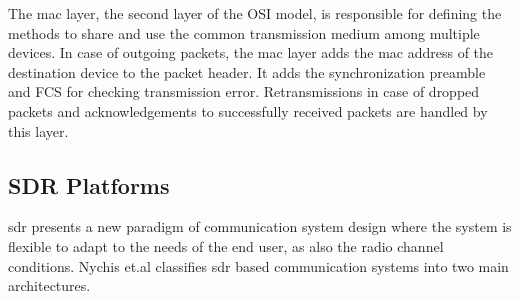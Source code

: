The \ac{mac} layer, the second layer of the \ac{OSI} model, is responsible for defining the methods to share and use the common transmission medium among multiple devices.
In case of outgoing packets, the \ac{mac} layer adds the \ac{mac} address of the destination device to the packet header.
It adds the synchronization preamble and \ac{FCS} for checking transmission error.
Retransmissions in case of dropped packets and acknowledgements to successfully received packets are handled by this layer.\\
 

\subsection{SDR Platforms}

\ac{sdr} presents a new paradigm of communication system design where the system is flexible to adapt to the needs of the end user, as also the radio channel conditions. Nychis et.al \cite{nychis_enabling_nodate} classifies \ac{sdr} based communication systems into two main architectures.


